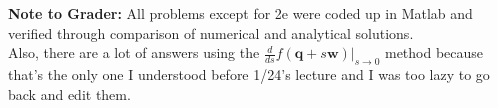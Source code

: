 \documentclass[11pt]{article}
\newcommand{\bq}{\mathbf{q}}
\newcommand{\bw}{\mathbf{w}}
\begin{document}
\noindent \textbf{Note to Grader:}
All problems except for 2e were coded up in Matlab and verified through comparison of numerical and analytical solutions. \\

\noindent Also, there are a lot of answers using the $\frac{d}{ds} f(\bq + s \bw) \big|_{s \to 0}$ method because that's the only one I understood before 1/24's lecture and I was too lazy to go back and edit them.
\end{document}
